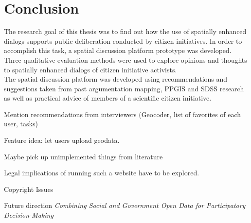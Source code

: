 \section{Conclusion}
\label{chap:conclusion}
The research goal of this thesis was to find out how the use of spatially enhanced dialogs supports public deliberation conducted by citizen initiatives. In order to accomplish this task, a spatial discussion platform prototype was developed. Three qualitative evaluation methods were used to explore opinions and thoughts to spatially enhanced dialogs of citizen initiative activists.\\
The spatial discussion platform was developed using recommendations and suggestions taken from past argumentation mapping, PPGIS and SDSS research as well as practical advice of members of a scientific citizen initiative.




Mention recommendations from interviewers (Geocoder, list of favorites of each user, tasks)

Feature idea: let users upload geodata.

Maybe pick up unimplemented things from literature

Legal implications of running such a website have to be explored.

Copyright Issues \cite{Carver2001_PPGIS_Cyberdemocracy}


Future direction \textit{Combining Social and Government Open Data for Participatory Decision-Making}